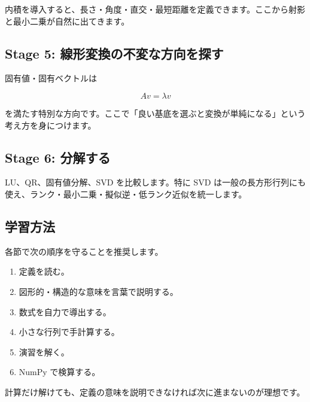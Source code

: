 \documentclass[
  11pt,
  a4paper,
]{ltjsarticle}
\providecommand{\tightlist}{%
  \setlength{\itemsep}{0pt}\setlength{\parskip}{0pt}}
\begin{document}
内積を導入すると、長さ・角度・直交・最短距離を定義できます。ここから射影と最小二乗が自然に出てきます。

\hypertarget{stage-5-ux7ddaux5f62ux5909ux63dbux306eux4e0dux5909ux306aux65b9ux5411ux3092ux63a2ux3059}{%
\subsection{Stage 5:
線形変換の不変な方向を探す}\label{stage-5-ux7ddaux5f62ux5909ux63dbux306eux4e0dux5909ux306aux65b9ux5411ux3092ux63a2ux3059}}

固有値・固有ベクトルは

\[
Av=\lambda v
\]

を満たす特別な方向です。ここで「良い基底を選ぶと変換が単純になる」という考え方を身につけます。

\hypertarget{stage-6-ux5206ux89e3ux3059ux308b}{%
\subsection{Stage 6: 分解する}\label{stage-6-ux5206ux89e3ux3059ux308b}}

LU、QR、固有値分解、SVD を比較します。特に SVD
は一般の長方形行列にも使え、ランク・最小二乗・擬似逆・低ランク近似を統一します。

\hypertarget{ux5b66ux7fd2ux65b9ux6cd5}{%
\subsection{学習方法}\label{ux5b66ux7fd2ux65b9ux6cd5}}

各節で次の順序を守ることを推奨します。

\begin{enumerate}
\def\labelenumi{\arabic{enumi}.}
\tightlist
\item
  定義を読む。
\item
  図形的・構造的な意味を言葉で説明する。
\item
  数式を自力で導出する。
\item
  小さな行列で手計算する。
\item
  演習を解く。
\item
  NumPy で検算する。
\end{enumerate}

計算だけ解けても、定義の意味を説明できなければ次に進まないのが理想です。
\end{document}

